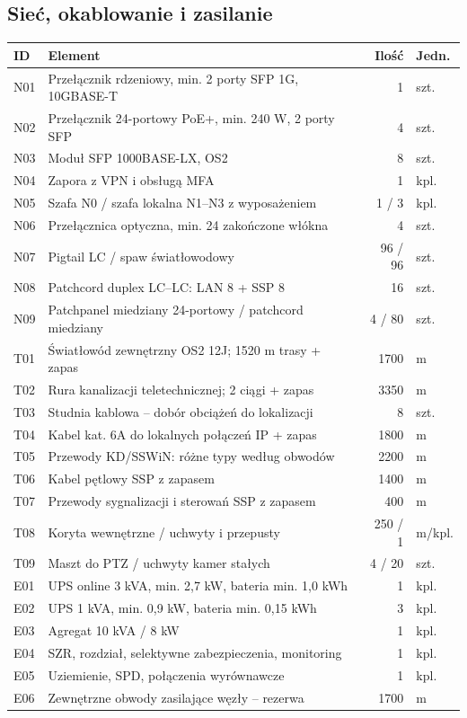 \subsection{Sieć, okablowanie i zasilanie}
\begingroup\small
\begin{tabularx}{\linewidth}{@{}P{11mm}Y r P{17mm}@{}}
\toprule\textbf{ID} & \textbf{Element} & \textbf{Ilość} & \textbf{Jedn.}\\\midrule
N01 & Przełącznik rdzeniowy, min. 2 porty SFP 1G, 10GBASE-T & 1 & szt.\\
N02 & Przełącznik 24-portowy PoE+, min. 240 W, 2 porty SFP & 4 & szt.\\
N03 & Moduł SFP 1000BASE-LX, OS2 & 8 & szt.\\
N04 & Zapora z VPN i obsługą MFA & 1 & kpl.\\
N05 & Szafa N0 / szafa lokalna N1--N3 z wyposażeniem & 1 / 3 & kpl.\\
N06 & Przełącznica optyczna, min. 24 zakończone włókna & 4 & szt.\\
N07 & Pigtail LC / spaw światłowodowy & 96 / 96 & szt.\\
N08 & Patchcord duplex LC--LC: LAN 8 + SSP 8 & 16 & szt.\\
N09 & Patchpanel miedziany 24-portowy / patchcord miedziany & 4 / 80 & szt.\\\midrule
T01 & Światłowód zewnętrzny OS2 12J; 1520 m trasy + zapas & 1700 & m\\
T02 & Rura kanalizacji teletechnicznej; 2 ciągi + zapas & 3350 & m\\
T03 & Studnia kablowa -- dobór obciążeń do lokalizacji & 8 & szt.\\
T04 & Kabel kat. 6A do lokalnych połączeń IP + zapas & 1800 & m\\
T05 & Przewody KD/SSWiN: różne typy według obwodów & 2200 & m\\
T06 & Kabel pętlowy SSP z zapasem & 1400 & m\\
T07 & Przewody sygnalizacji i sterowań SSP z zapasem & 400 & m\\
T08 & Koryta wewnętrzne / uchwyty i przepusty & 250 / 1 & m/kpl.\\
T09 & Maszt do PTZ / uchwyty kamer stałych & 4 / 20 & szt.\\\midrule
E01 & UPS online 3 kVA, min. 2,7 kW, bateria min. 1,0 kWh & 1 & kpl.\\
E02 & UPS 1 kVA, min. 0,9 kW, bateria min. 0,15 kWh & 3 & kpl.\\
E03 & Agregat 10 kVA / 8 kW & 1 & kpl.\\
E04 & SZR, rozdział, selektywne zabezpieczenia, monitoring & 1 & kpl.\\
E05 & Uziemienie, SPD, połączenia wyrównawcze & 1 & kpl.\\
E06 & Zewnętrzne obwody zasilające węzły -- rezerwa & 1700 & m\\\bottomrule
\end{tabularx}
\endgroup

